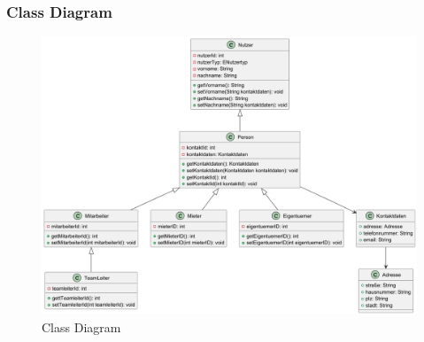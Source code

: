 \begin{frame}
\frametitle{Class Diagram}

\begin{figure}
  \includegraphics[height=0.9\textheight]{figures/model_Person.png}
  \caption{Class Diagram}
  \label{fig:class}
\end{figure}

\end{frame}




